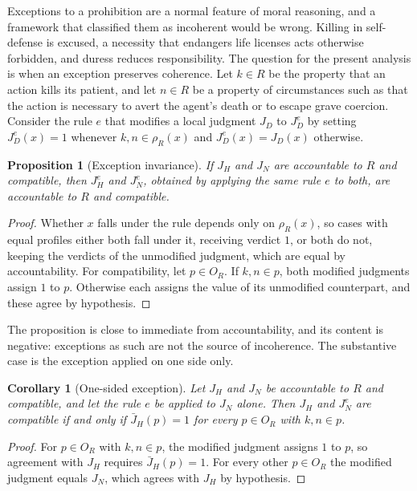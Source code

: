 \documentclass[11pt]{article}
\theoremstyle{definition}
\theoremstyle{plain}
\newtheorem{proposition}[definition]{Proposition}
\newtheorem{corollary}[definition]{Corollary}
\theoremstyle{definition}
\newcommand{\Judg}{J}
\newcommand{\prof}{\rho}
\newcommand{\Rel}{R}
\begin{document}
Exceptions to a prohibition are a normal feature of moral reasoning, and a framework that classified them as incoherent would be wrong. Killing in self-defense is excused, a necessity that endangers life licenses acts otherwise forbidden, and duress reduces responsibility. The question for the present analysis is when an exception preserves coherence. Let $k\in\Rel$ be the property that an action kills its patient, and let $n\in\Rel$ be a property of circumstances such as that the action is necessary to avert the agent's death or to escape grave coercion. Consider the rule $e$ that modifies a local judgment $\Judg_D$ to $\Judg_D^{e}$ by setting $\Judg_D^{e}(x)=1$ whenever $k,n\in\prof_{\Rel}(x)$ and $\Judg_D^{e}(x)=\Judg_D(x)$ otherwise.

\begin{proposition}[Exception invariance]\label{prop:exception}
If $\Judg_H$ and $\Judg_N$ are accountable to $\Rel$ and compatible, then $\Judg_H^{e}$ and $\Judg_N^{e}$, obtained by applying the same rule $e$ to both, are accountable to $\Rel$ and compatible.
\end{proposition}

\begin{proof}
Whether $x$ falls under the rule depends only on $\prof_{\Rel}(x)$, so cases with equal profiles either both fall under it, receiving verdict $1$, or both do not, keeping the verdicts of the unmodified judgment, which are equal by accountability. For compatibility, let $p\in O_{\Rel}$. If $k,n\in p$, both modified judgments assign $1$ to $p$. Otherwise each assigns the value of its unmodified counterpart, and these agree by hypothesis.
\end{proof}

The proposition is close to immediate from accountability, and its content is negative: exceptions as such are not the source of incoherence. The substantive case is the exception applied on one side only.

\begin{corollary}[One-sided exception]\label{cor:onesided}
Let $\Judg_H$ and $\Judg_N$ be accountable to $\Rel$ and compatible, and let the rule $e$ be applied to $\Judg_N$ alone. Then $\Judg_H$ and $\Judg_N^{e}$ are compatible if and only if $\bar\Judg_H(p)=1$ for every $p\in O_{\Rel}$ with $k,n\in p$.
\end{corollary}

\begin{proof}
For $p\in O_{\Rel}$ with $k,n\in p$, the modified judgment assigns $1$ to $p$, so agreement with $\Judg_H$ requires $\bar\Judg_H(p)=1$. For every other $p\in O_{\Rel}$ the modified judgment equals $\Judg_N$, which agrees with $\Judg_H$ by hypothesis.
\end{proof}
\end{document}
